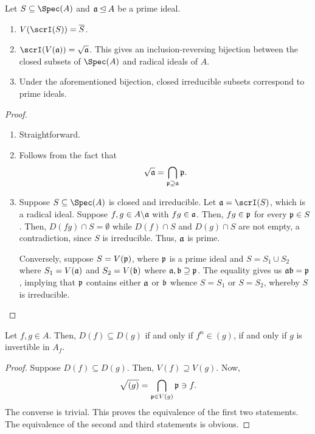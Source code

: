 \begin{proposition}
    Let $S\subseteq\Spec(A)$ and $\mathfrak a\unlhd A$ be a prime ideal.
    \begin{enumerate}[label=(\alph*)]
        \item $V(\scrI(S)) = \overline S$.
        \item $\scrI(V(\fraka)) = \sqrt{\fraka}$. This gives an inclusion-reversing bijection between the closed subsets of $\Spec(A)$ and radical ideals of $A$.
        \item Under the aforementioned bijection, closed irreducible subsets correspond to prime ideals.
    \end{enumerate}
\end{proposition}
\begin{proof}
\begin{enumerate}[label=(\alph*)]
    \item Straightforward.
    \item Follows from the fact that 
    \begin{equation*}
        \sqrt{\mathfrak a} = \bigcap_{\mathfrak p\supseteq\mathfrak a}\mathfrak p.
    \end{equation*}
    \item Suppose $S\subseteq\Spec(A)$ is closed and irreducible. Let $\fraka = \scrI(S)$, which is a radical ideal. Suppose $f,g\in A\backslash\mathfrak a$ with $fg\in\mathfrak a$. Then, $fg\in\mathfrak p$ for every $\mathfrak p\in S$. Then, $D(fg)\cap S = \emptyset$ while $D(f)\cap S$ and $D(g)\cap S$ are not empty, a contradiction, since $S$ is irreducible. Thus, $\mathfrak a$ is prime.

    Conversely, suppose $S = V(\mathfrak p)$, where $\mathfrak p$ is a prime ideal and $S = S_1\cup S_2$ where $S_1 = V(\mathfrak a)$ and $S_2 = V(\mathfrak b)$ where $\mathfrak a,\mathfrak b\supseteq\mathfrak p$. The equality gives us $\mathfrak a\mathfrak b = \mathfrak p$, implying that $\mathfrak p$ contains either $\mathfrak a$ or $\mathfrak b$ whence $S = S_1$ or $S = S_2$, whereby $S$ is irreducible.
\end{enumerate}
\end{proof}

\begin{lemma}
    Let $f,g\in A$. Then, $D(f)\subseteq D(g)$ if and only if $f^n\in(g)$, if and only if $g$ is invertible in $A_f$.
\end{lemma}
\begin{proof}
    Suppose $D(f)\subseteq D(g)$. Then, $V(f)\supseteq V(g)$. Now, 
    \begin{equation*}
        \sqrt{(g)} = \bigcap_{\mathfrak p\in V(g)}\mathfrak p\ni f.
    \end{equation*}
    The converse is trivial. This proves the equivalence of the first two statements. The equivalence of the second and third statements is obvious.
\end{proof}

